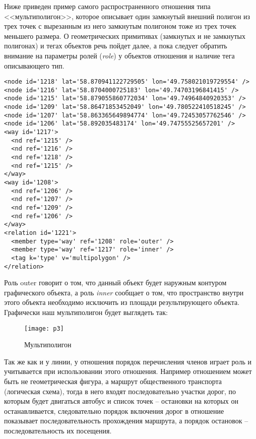 Ниже приведен пример самого распространенного отношения типа <<мультиполигон>>, 
которое описывает один замкнутый внешний полигон из трех точек с вырезанным из 
него замкнутым полигоном тоже из трех точек меньшего размера. О геометрических 
примитивах (замкнутых и не замкнутых полигонах) и тегах объектов речь пойдет 
далее, а пока следует обратить внимание на параметры ролей (\emph{role}) у 
объектов отношения и наличие тега описывающего тип. 

\small
\begin{verbatim}
<node id='1218' lat='58.870941122729505' lon='49.758021019729554' />
<node id='1216' lat='58.8704000725183' lon='49.74703196841415' />
<node id='1215' lat='58.879055860772034' lon='49.74964840920353' />
<node id='1209' lat='58.86471853452049' lon='49.780522410518245' />
<node id='1207' lat='58.863365649894774' lon='49.72453057762546' />
<node id='1206' lat='58.892035483174' lon='49.74755525657201' />
<way id='1217'>
  <nd ref='1215' />
  <nd ref='1216' />
  <nd ref='1218' />
  <nd ref='1215' />
</way>
<way id='1208'>
  <nd ref='1206' />
  <nd ref='1207' />
  <nd ref='1209' />
  <nd ref='1206' />
</way>
<relation id='1221'>
  <member type='way' ref='1208' role='outer' />
  <member type='way' ref='1217' role='inner' />
  <tag k='type' v='multipolygon' />
</relation>
\end{verbatim}
\normalsize

Роль outer говорит о том, что данный объект будет наружным контуром 
графического объекта, а роль \emph{inner} сообщает о том, что пространство 
внутри этого объекта необходимо исключить из площади результирующего объекта. 
Графически наш мультиполигон будет выглядеть так:

\begin{figure}[ht!]
    \center
    \texttt{[image: p3]}
    \caption{Мультиполигон}
    \label{multipoly01}
\end{figure}

Так же как и у линии, у отношения порядок перечисления членов играет роль и 
учитывается при использовании этого отношения. Например отношением может быть 
не геометрическая фигура, а маршрут общественного транспорта (логическая 
схема), тогда в него входят последовательно участки дорог, по которым будет 
двигаться автобус и список точек -- остановки на которых он останавливается, 
следовательно порядок включения дорог в отношение показывает последовательность 
прохождения маршрута, а порядок остановок -- последовательность их посещения.

